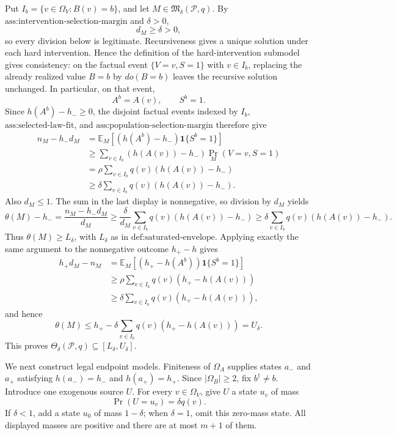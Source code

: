 Put \(I_b=\{v\in\Omega_V:B(v)=b\}\), and let \(M\in\mathfrak M_\delta(\mathcal P,q)\).  By \(\text{ass:intervention-selection-margin}\) and \(\delta>0\),
\[
d_M\geq\delta>0,
\]
so every division below is legitimate.  Recursiveness gives a unique solution under each hard intervention.  Hence the definition of the hard-intervention submodel gives consistency: on the factual event \(\{V=v,S=1\}\) with \(v\in I_b\), replacing the already realized value \(B=b\) by \(do(B=b)\) leaves the recursive solution unchanged.  In particular, on that event,
\[
A^b=A(v),\qquad S^b=1.
\]
Since \(h(A^b)-h_-\geq0\), the disjoint factual events indexed by \(I_b\), \(\text{ass:selected-law-fit}\), and \(\text{ass:population-selection-margin}\) therefore give
\[
\begin{aligned}
n_M-h_-d_M
&=\mathbb E_M\!\left[(h(A^b)-h_-)\mathbf 1\{S^b=1\}\right]\\
&\geq\sum_{v\in I_b}(h(A(v))-h_-)\Pr_M(V=v,S=1)\\
&=\rho\sum_{v\in I_b}q(v)(h(A(v))-h_-)\\
&\geq\delta\sum_{v\in I_b}q(v)(h(A(v))-h_-).
\end{aligned}
\]
Also \(d_M\leq1\).  The sum in the last display is nonnegative, so division by \(d_M\) yields
\[
\theta(M)-h_-=\frac{n_M-h_-d_M}{d_M}
\geq \frac{\delta}{d_M}\sum_{v\in I_b}q(v)(h(A(v))-h_-)
\geq\delta\sum_{v\in I_b}q(v)(h(A(v))-h_-).
\]
Thus \(\theta(M)\geq L_\delta\), with \(L_\delta\) as in \(\text{def:saturated-envelope}\).  Applying exactly the same argument to the nonnegative outcome \(h_+-h\) gives
\[
\begin{aligned}
h_+d_M-n_M
&=\mathbb E_M\!\left[(h_+-h(A^b))\mathbf 1\{S^b=1\}\right]\\
&\geq\rho\sum_{v\in I_b}q(v)(h_+-h(A(v)))\\
&\geq\delta\sum_{v\in I_b}q(v)(h_+-h(A(v))),
\end{aligned}
\]
and hence
\[
\theta(M)\leq h_+-\delta\sum_{v\in I_b}q(v)(h_+-h(A(v)))=U_\delta.
\]
This proves \(\Theta_\delta(\mathcal P,q)\subseteq[L_\delta,U_\delta]\).

We next construct legal endpoint models.  Finiteness of \(\Omega_A\) supplies states \(a_-\) and \(a_+\) satisfying \(h(a_-)=h_-\) and \(h(a_+)=h_+\).  Since \(|\Omega_B|\geq2\), fix \(b^\dagger\neq b\).  Introduce one exogenous source \(U\).  For every \(v\in\Omega_V\), give \(U\) a state \(u_v\) of mass
\[
\Pr(U=u_v)=\delta q(v).
\]
If \(\delta<1\), add a state \(u_0\) of mass \(1-\delta\); when \(\delta=1\), omit this zero-mass state.  All displayed masses are positive and there are at most \(m+1\) of them.

